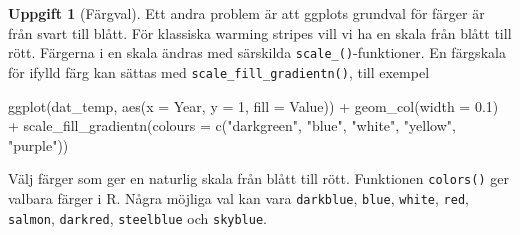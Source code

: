 \documentclass[
]{book}
\newenvironment{Shaded}{\begin{snugshade}}{\end{snugshade}}
\newcommand{\AttributeTok}[1]{\textcolor[rgb]{0.77,0.63,0.00}{#1}}
\newcommand{\DecValTok}[1]{\textcolor[rgb]{0.00,0.00,0.81}{#1}}
\newcommand{\FloatTok}[1]{\textcolor[rgb]{0.00,0.00,0.81}{#1}}
\newcommand{\FunctionTok}[1]{\textcolor[rgb]{0.00,0.00,0.00}{#1}}
\newcommand{\NormalTok}[1]{#1}
\newcommand{\SpecialCharTok}[1]{\textcolor[rgb]{0.00,0.00,0.00}{#1}}
\newcommand{\StringTok}[1]{\textcolor[rgb]{0.31,0.60,0.02}{#1}}
\theoremstyle{definition}
\theoremstyle{definition}
\theoremstyle{definition}
\newtheorem{exercise}{Uppgift}[chapter]
\theoremstyle{definition}
\theoremstyle{remark}
\begin{document}
\begin{exercise}[Färgval]
Ett andra problem är att ggplots grundval för färger är från svart till blått. För klassiska warming stripes vill vi ha en skala från blått till rött. Färgerna i en skala ändras med särskilda \texttt{scale\_()}-funktioner. En färgskala för ifylld färg kan sättas med \texttt{scale\_fill\_gradientn()}, till exempel

\begin{Shaded}
\begin{Highlighting}[]
\FunctionTok{ggplot}\NormalTok{(dat\_temp, }\FunctionTok{aes}\NormalTok{(}\AttributeTok{x =}\NormalTok{ Year, }\AttributeTok{y =} \DecValTok{1}\NormalTok{, }\AttributeTok{fill =}\NormalTok{ Value)) }\SpecialCharTok{+}
  \FunctionTok{geom\_col}\NormalTok{(}\AttributeTok{width =} \FloatTok{0.1}\NormalTok{) }\SpecialCharTok{+}
  \FunctionTok{scale\_fill\_gradientn}\NormalTok{(}\AttributeTok{colours =} \FunctionTok{c}\NormalTok{(}\StringTok{"darkgreen"}\NormalTok{, }\StringTok{"blue"}\NormalTok{, }\StringTok{"white"}\NormalTok{, }\StringTok{"yellow"}\NormalTok{, }\StringTok{"purple"}\NormalTok{))}
\end{Highlighting}
\end{Shaded}

Välj färger som ger en naturlig skala från blått till rött. Funktionen \texttt{colors()} ger valbara färger i R. Några möjliga val kan vara \texttt{darkblue}, \texttt{blue}, \texttt{white}, \texttt{red}, \texttt{salmon}, \texttt{darkred}, \texttt{steelblue} och \texttt{skyblue}.
\end{exercise}
\end{document}
